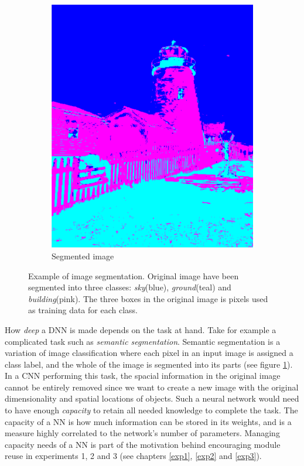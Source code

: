 \begin{figure}
\begin{subfigure}[ht]{0.49\linewidth}
        \includegraphics[width=\linewidth]{Chapters/2.Background/figures/segmentation.png}
        \caption{Segmented image}
    \end{subfigure}
    \caption[Image segmentation]{Example of image segmentation. Original image have been segmented into three classes: \textit{sky}(blue), \textit{ground}(teal) and \textit{building}(pink). The three boxes in the original image is pixels used as training data for each class.}
    \label{fig:semanticsegmentation}
\end{figure}

How \textit{deep} a DNN is made depends on the task at hand. Take for example a complicated task such as \textit{semantic segmentation}. Semantic segmentation is a variation of image classification where each pixel in an input image is assigned a class label, and the whole of the image is segmented into its parts (see figure \ref{fig:semanticsegmentation}). In a CNN performing this task, the spacial information in the original image cannot be entirely removed since we want to create a new image with the original dimensionality and spatial locations of objects. Such a neural network would need to have enough \textit{capacity} to retain all needed knowledge to complete the task. The capacity of a NN is how much information can be stored in its weights, and is a measure highly correlated to the network's number of parameters. Managing capacity needs of a NN is part of the motivation behind encouraging module reuse in experiments 1, 2 and 3 (see chapters \ref{exp1}, \ref{exp2} and \ref{exp3}).

